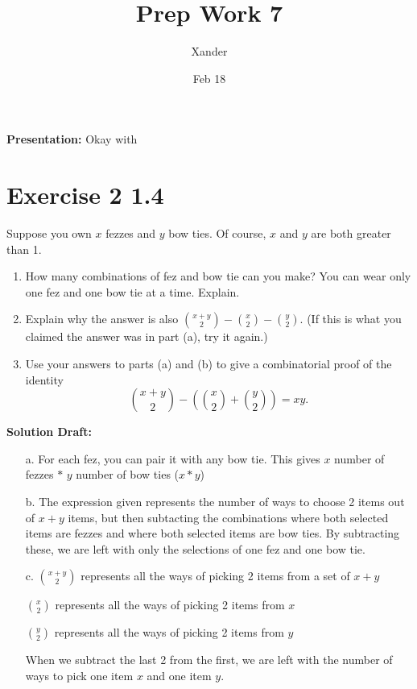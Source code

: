 \documentclass{article}
\title{Prep Work 7}
\author{Xander}
\date{Feb 18}
\begin{document}
\maketitle
\noindent\textbf{Presentation:} Okay with 

\section*{Exercise 2 1.4}  


Suppose you own \( x \) fezzes and \( y \) bow ties. Of course, \( x \) and \( y \) are both greater than 1.
\begin{enumerate}
    \item How many combinations of fez and bow tie can you make? You can wear only one fez and one bow tie at a time. Explain.
    \item Explain why the answer is also \( \binom{x+y}{2} - \binom{x}{2} - \binom{y}{2} \). (If this is what you claimed the answer was in part (a), try it again.)
    \item Use your answers to parts (a) and (b) to give a combinatorial proof of the identity
    \[
    \binom{x + y}{2} - \left( \binom{x}{2} + \binom{y}{2} \right) = xy .
    \]
\end{enumerate}

\vspace{0.5cm}
\noindent\textbf{Solution Draft:} 
\vspace{0.2cm}

\begin{enumerate}
    \item[a.] For each fez, you can pair it with any bow tie. This gives $x$ number of fezzes $*$ $y$ number of bow ties ($x*y$)
    \item[b.] The expression given represents the number of ways to choose 2 items out of $x+y$ items, but then subtacting the combinations where both selected items are fezzes and where both selected items are bow ties. By subtracting these, we are left with only the selections of one fez and one bow tie.
    \item[c.] 
    $\binom{x + y}{2}$ represents all the ways of picking 2 items from a set of $x+y$

    $\binom{x}{2}$ represents all the ways of picking 2 items from $x$

    $\binom{y}{2}$ represents all the ways of picking 2 items from $y$

    When we subtract the last 2 from the first, we are left with the number of ways to pick one item $x$ and one item $y$.
    \end{enumerate}
\end{document}
